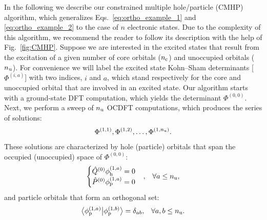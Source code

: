 \documentclass{article}
\begin{document}
In the following we describe our constrained multiple hole/particle (CMHP) algorithm, which generalizes Eqs.~\eqref{eq:ortho_example_1} and \eqref{eq:ortho_example_2} to the case of $n$ electronic states.  Due to the complexity of this algorithm, we recommend the reader to follow its description with the help of Fig.~\ref{fig:CMHP}.
Suppose we are interested in the excited states that result from the excitation of a given number of core orbitals ($n_{\rm c}$) and unoccupied orbitals ($n_{\rm u}$).
For convenience we will label the excited state Kohn--Sham determinants [$\Phi^{(i,a)}$] with two indices, $i$ and $a$, which stand respectively for the core and unoccupied orbital that are involved in an excited state.
Our algorithm starts with a ground-state DFT computation, which yields the determinant $\Phi^{(0,0)}$.
Next, we perform a sweep of $n_{\rm u}$ OCDFT computations, which produces the series of solutions:
\begin{equation}
\Phi^{(1,1)}, \Phi^{(1,2)}, \ldots, \Phi^{(1,n_{\rm u})}.
\end{equation}
These solutions are characterized by hole (particle) orbitals that span the occupied (unoccupied) space of $\Phi^{(0,0)}$:
\begin{align}
\begin{cases}
\hat{Q}^{(0)}\phi_{\rm h}^{(1,a)}= 0\\
\hat{P}^{(0)}\phi_{\rm p}^{(1,a)}= 0
\end{cases} &,&\forall a \leq n_{\rm u},
\end{align}
and particle orbitals that form an orthogonal set:
\begin{align}
\braket[1]{\phi^{(1,a)}_{\rm p}}{\phi^{(1,b)}_{\rm p}} &= \delta_{ab}, &\forall a,b \leq n_{\rm u}.
\end{align}
\end{document}
